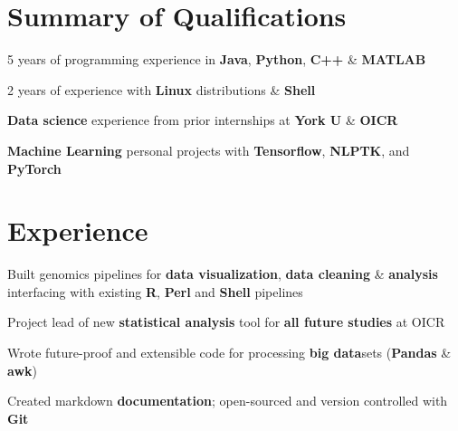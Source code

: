 \documentclass[]{chandan-cv}
\begin{document}
\begin{minipage}[t]{0.71\textwidth}


\section{Summary of Qualifications}
\runsubsection{ }
\descript{ }
\location{ }
\vspace{\topsep} %
\begin{tightemize}
	\item 5 years of programming experience in \textbf{Java}, \textbf{Python}, \textbf{C++} \& \textbf{MATLAB}
	\item 2 years of experience with \textbf{Linux} distributions \& \textbf{Shell}
	\item \textbf{Data science} experience from prior internships at \textbf{York U} \& \textbf{OICR}
	\item \textbf{Machine Learning} personal projects with \textbf{Tensorflow}, \textbf{NLPTK}, and \textbf{PyTorch}
\end{tightemize}
\sectionsep


\section{Experience}
\begin{tightemize}
	\item Built genomics pipelines for \textbf{data visualization}, \textbf{data cleaning} \& \textbf{analysis} interfacing with existing \textbf{R}, \textbf{Perl} and \textbf{Shell} pipelines
	\item Project lead of new \textbf{statistical analysis} tool for \textbf{all future studies} at OICR
	\item Wrote future-proof and extensible code for processing \textbf{big data}sets (\textbf{Pandas} \& \textbf{awk})
	\item Created markdown \textbf{documentation}; open-sourced and version controlled with \textbf{Git}
\end{tightemize}
\sectionsep


\end{minipage}
\end{document}

